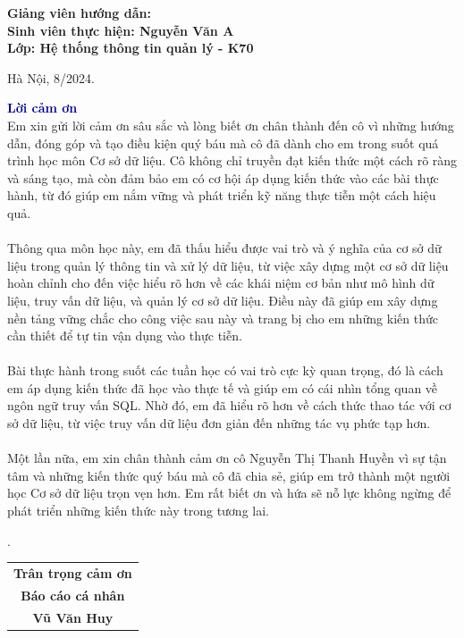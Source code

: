 \begin{titlepage}
\begin{center}
\hspace{1.8 cm} \textbf{ Giảng viên hướng dẫn:\hspace{0.2cm}{TS.Nguyễn Thị Thanh A}}\\[0.5cm]
\hspace{1.8 cm} \textbf{ Sinh viên thực hiện: Nguyễn Văn A }\\ [0.55cm]

\hspace{1.8 cm} \textbf{Lớp: Hệ thống thông tin quản lý - K70}
\end{center}


\vspace{4cm}

\begin{center}
   \hspace{1.8 cm}  Hà Nội, 8/2024.
\end{center}

\end{titlepage}



\newpage
\fontsize{13pt}{22pt}\selectfont

\textcolor{DarkBlue}{\textbf{\fontsize{16pt}{22pt}\selectfont Lời cảm ơn}}\\

Em xin gửi lời cảm ơn sâu sắc và lòng biết ơn chân thành đến cô vì những hướng dẫn, đóng góp và tạo điều kiện quý báu mà cô đã dành cho em trong suốt quá trình học môn Cơ sở dữ liệu. Cô không chỉ truyền đạt kiến thức một cách rõ ràng và sáng tạo, mà còn đảm bảo em có cơ hội áp dụng kiến thức vào các bài thực hành, từ đó giúp em nắm vững và phát triển kỹ năng thực tiễn một cách hiệu quả.
\\
\\
Thông qua môn học này, em đã thấu hiểu được vai trò và ý nghĩa của cơ sở dữ liệu trong quản lý thông tin và xử lý dữ liệu, từ việc xây dựng một cơ sở dữ liệu hoàn chỉnh cho đến việc hiểu rõ hơn về các khái niệm cơ bản như mô hình dữ liệu, truy vấn dữ liệu, và quản lý cơ sở dữ liệu. Điều này đã giúp em xây dựng nền tảng vững chắc cho công việc sau này và trang bị cho em những kiến thức cần thiết để tự tin vận dụng vào thực tiễn.
\\
\\
Bài thực hành trong suốt các tuần học có vai trò cực kỳ quan trọng, đó là cách em áp dụng kiến thức đã học vào thực tế và giúp em có cái nhìn tổng quan về ngôn ngữ truy vấn SQL. Nhờ đó, em đã hiểu rõ hơn về cách thức thao tác với cơ sở dữ liệu, từ việc truy vấn dữ liệu đơn giản đến những tác vụ phức tạp hơn.
\\\\
Một lần nữa, em xin chân thành cảm ơn cô Nguyễn Thị Thanh Huyền vì sự tận tâm và những kiến thức quý báu mà cô đã chia sẻ, giúp em trở thành một người học Cơ sở dữ liệu trọn vẹn hơn. Em rất biết ơn và hứa sẽ nỗ lực không ngừng để phát triển những kiến thức này trong tương lai.

\begin{flushright}
.

\begin{tabular}{c}
\textbf{Trân trọng cảm ơn}\\

\textbf{Báo cáo cá nhân}\\

\textbf{Vũ Văn Huy }\\
\end{tabular}
\end{flushright}
